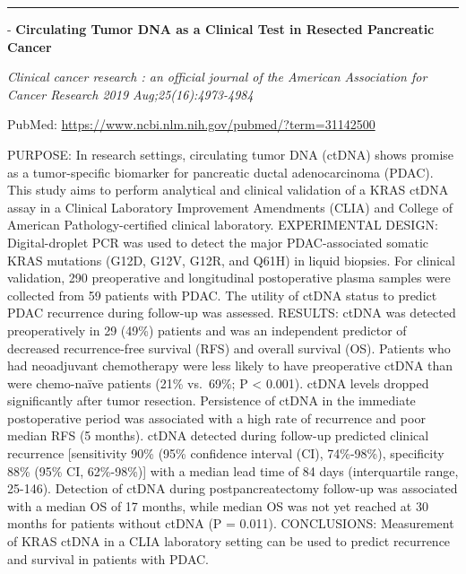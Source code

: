 \documentclass[]{article}
\begin{document}
{}

{}

\begin{center}\rule{0.5\linewidth}{\linethickness}\end{center}

 - \textbf{Circulating Tumor DNA as a Clinical Test in Resected
Pancreatic Cancer}

\emph{Clinical cancer research : an official journal of the American
Association for Cancer Research 2019 Aug;25(16):4973-4984}

PubMed: \url{https://www.ncbi.nlm.nih.gov/pubmed/?term=31142500}

PURPOSE: In research settings, circulating tumor DNA (ctDNA) shows
promise as a tumor-specific biomarker for pancreatic ductal
adenocarcinoma (PDAC). This study aims to perform analytical and
clinical validation of a KRAS ctDNA assay in a Clinical Laboratory
Improvement Amendments (CLIA) and College of American
Pathology-certified clinical laboratory. EXPERIMENTAL DESIGN:
Digital-droplet PCR was used to detect the major PDAC-associated somatic
KRAS mutations (G12D, G12V, G12R, and Q61H) in liquid biopsies. For
clinical validation, 290 preoperative and longitudinal postoperative
plasma samples were collected from 59 patients with PDAC. The utility of
ctDNA status to predict PDAC recurrence during follow-up was assessed.
RESULTS: ctDNA was detected preoperatively in 29 (49\%) patients and was
an independent predictor of decreased recurrence-free survival (RFS) and
overall survival (OS). Patients who had neoadjuvant chemotherapy were
less likely to have preoperative ctDNA than were chemo-naïve patients
(21\% vs.~69\%; P \textless{} 0.001). ctDNA levels dropped significantly
after tumor resection. Persistence of ctDNA in the immediate
postoperative period was associated with a high rate of recurrence and
poor median RFS (5 months). ctDNA detected during follow-up predicted
clinical recurrence {[}sensitivity 90\% (95\% confidence interval (CI),
74\%-98\%), specificity 88\% (95\% CI, 62\%-98\%){]} with a median lead
time of 84 days (interquartile range, 25-146). Detection of ctDNA during
postpancreatectomy follow-up was associated with a median OS of 17
months, while median OS was not yet reached at 30 months for patients
without ctDNA (P = 0.011). CONCLUSIONS: Measurement of KRAS ctDNA in a
CLIA laboratory setting can be used to predict recurrence and survival
in patients with PDAC.

{}

{}
\end{document}
